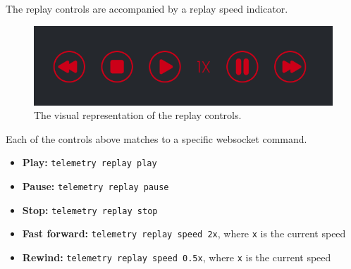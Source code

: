 The replay controls are accompanied by a replay speed indicator.

\begin{figure}[ht]
\centering
\includegraphics[width=12cm]{images/replayControls.png}
\caption{The visual representation of the replay controls.}
\label{fig:Replay Controls}
\end{figure}

Each of the controls above matches to a specific websocket command.

\begin{itemize}
    \item \textbf{Play:} \verb|telemetry replay play|
    \item \textbf{Pause:} \verb|telemetry replay pause|
    \item \textbf{Stop:} \verb|telemetry replay stop|
    \item \textbf{Fast forward:} \verb|telemetry replay speed 2x|, where \verb|x| is the current speed
    \item \textbf{Rewind:} \verb|telemetry replay speed 0.5x|, where \verb|x| is the current speed
\end{itemize}
